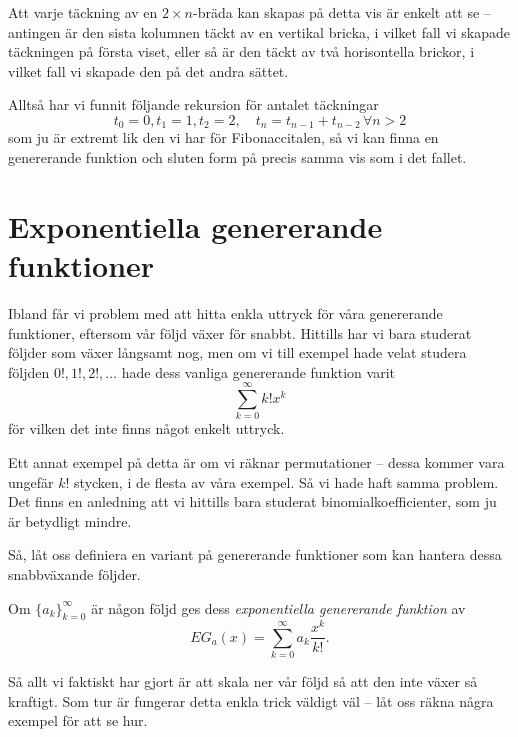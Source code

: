 \documentclass[nobib]{tufte-handout}
\begin{document}
\begin{example}
  Att varje täckning av en $2\times n$-bräda kan skapas på detta vis är enkelt att se -- antingen är den sista kolumnen täckt av en vertikal bricka, i vilket fall vi skapade täckningen på första viset, eller så är den täckt av två horisontella brickor, i vilket fall vi skapade den på det andra sättet.

  Alltså har vi funnit följande rekursion för antalet täckningar
  $$t_0 = 0, t_1 = 1, t_2 = 2, \quad t_n = t_{n-1} + t_{n-2} \, \forall n > 2$$
  som ju är extremt lik den vi har för Fibonaccitalen, så vi kan finna en genererande funktion och sluten form på precis samma vis som i det fallet.
\end{example}

\section{Exponentiella genererande funktioner}

Ibland får vi problem med att hitta enkla uttryck för våra genererande funktioner, eftersom vår följd växer för snabbt. Hittills har vi bara studerat följder som växer långsamt nog, men om vi till exempel hade velat studera följden $0!, 1!, 2!,\ldots$ hade dess vanliga genererande funktion varit 
$$\sum_{k=0}^{\infty} k!x^k$$
för vilken det inte finns något enkelt uttryck.

Ett annat exempel på detta är om vi räknar permutationer -- dessa kommer vara ungefär $k!$ stycken, i de flesta av våra exempel. Så vi hade haft samma problem. Det finns en anledning att vi hittills bara studerat binomialkoefficienter, som ju är betydligt mindre.

Så, låt oss definiera en variant på genererande funktioner som kan hantera dessa snabbväxande följder.

\begin{definition}
  Om $\{a_k\}_{k=0}^\infty$ är någon följd ges dess \emph{exponentiella genererande funktion} av
  $$EG_a(x) = \sum_{k=0}^{\infty} a_k \frac{x^k}{k!}.$$
\end{definition}

Så allt vi faktiskt har gjort är att skala ner vår följd så att den inte växer så kraftigt. Som tur är fungerar detta enkla trick väldigt väl -- låt oss räkna några exempel för att se hur.
\end{document}
